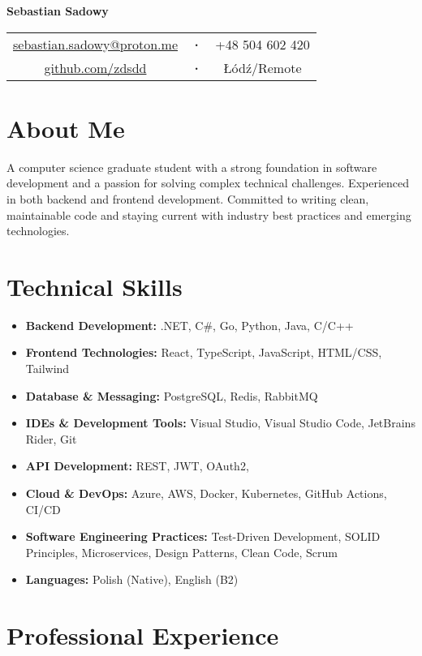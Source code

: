 \documentclass[a4paper,10pt]{article}
\begin{document}
\begin{center}
    {\Huge\textbf{Sebastian Sadowy}} \\[0.3cm]
    \begin{tabular}{c c c}
        \href{mailto:sebastian.sadowy@proton.me}{sebastian.sadowy@proton.me} & 
        \textbf{·} & 
        +48 504 602 420 \\
        \href{https://github.com/zdsdd}{github.com/zdsdd} &
        \textbf{·} &
        Łódź/Remote
    \end{tabular}
\end{center}

\section{About Me}
A computer science graduate student with a strong foundation in software development and a passion for solving complex technical challenges. Experienced in both backend and frontend development. Committed to writing clean, maintainable code and staying current with industry best practices and emerging technologies.

\section{Technical Skills}
\begin{itemize}[leftmargin=0.5cm, itemsep=4pt]
    \item \textbf{Backend Development:} .NET, C\#, Go, Python, Java, C/C++
    \item \textbf{Frontend Technologies:} React, TypeScript, JavaScript, HTML/CSS, Tailwind
    \item \textbf{Database \& Messaging:} PostgreSQL, Redis, RabbitMQ
    \item \textbf{IDEs \& Development Tools:} Visual Studio, Visual Studio Code, JetBrains Rider, Git
    \item \textbf{API Development:} REST, JWT, OAuth2,
    \item \textbf{Cloud \& DevOps:} Azure, AWS, Docker, Kubernetes, GitHub Actions, CI/CD
    \item \textbf{Software Engineering Practices:} Test-Driven Development, SOLID Principles, Microservices, Design Patterns, Clean Code, Scrum
    \item \textbf{Languages:} Polish (Native), English (B2)
\end{itemize}
\section{Professional Experience}
\end{document}
